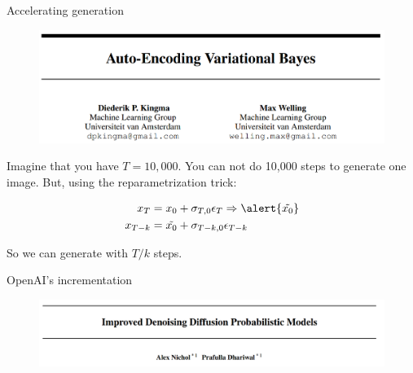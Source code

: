 \documentclass{beamer}
\begin{document}
\begin{frame}{Accelerating generation}
    \begin{figure}
        \includegraphics[width=\textwidth]{imgs/papier_accelerer.png}
    \end{figure}
    Imagine that you have $T = 10,000$. You \alert{can not do 10,000 steps to generate one image}. But, using the \alert{reparametrization trick}:

    \begin{align*}
        x_{T} &= x_0 + \sigma_{T,0} \epsilon_{T} \Rightarrow \alert{\tilde{x_0}}\\
        x_{T-k} &= \tilde{x_0} + \sigma_{T-k,0} \epsilon_{T-k}
    \end{align*}

    So we can \alert{generate with $T/k$ steps}.
    
\end{frame}

\begin{frame}{OpenAI's incrementation}
    \begin{figure}
        \centering
        \includegraphics[width= \textwidth]{imgs/paper_gen2.png}
    \end{figure}

\end{frame}
\end{document}
